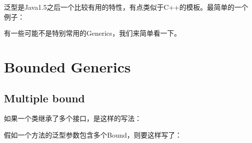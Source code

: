 \documentclass[12pt]{article}
\begin{document}
\makeblogtitle

泛型是Java1.5之后一个比较有用的特性，有点类似于C++的模板。最简单的一个例子：

\begin{Shaded}
\begin{Highlighting}[]
 \OperatorTok{\textless{}}\OperatorTok{\textgreater{}} \OperatorTok{\{}
    \OperatorTok{;}

    \OperatorTok{(}\OperatorTok{)} \OperatorTok{\{}
         \OperatorTok{=}\OperatorTok{;}
    \OperatorTok{\}}
\OperatorTok{\}}
\end{Highlighting}
\end{Shaded}

有一些可能不是特别常用的Generics，我们来简单看一下。

\section{Bounded Generics}\label{bounded-generics}

\subsection{Multiple bound}\label{multiple-bound}

如果一个类继承了多个接口，是这样的写法：

\begin{Shaded}
\begin{Highlighting}[]
\OperatorTok{\{\}}
\OperatorTok{\{\}}
 \OperatorTok{\{\}}

\OperatorTok{,}\OperatorTok{\{\}}
\end{Highlighting}
\end{Shaded}

假如一个方法的泛型参数包含多个Bound，则要这样写了：

\begin{Shaded}
\begin{Highlighting}[]
\OperatorTok{\textless{}}\OperatorTok{\&}\OperatorTok{\textgreater{}}  \OperatorTok{(}\OperatorTok{)\{\}}
\OperatorTok{\textless{}}\OperatorTok{\textgreater{}}  \OperatorTok{(}\OperatorTok{)\{\}}
\OperatorTok{\textless{}}\OperatorTok{\&}\OperatorTok{\&}\OperatorTok{\textgreater{}}  \OperatorTok{(}\OperatorTok{)\{\}}
\end{Highlighting}
\end{Shaded}
\end{document}
